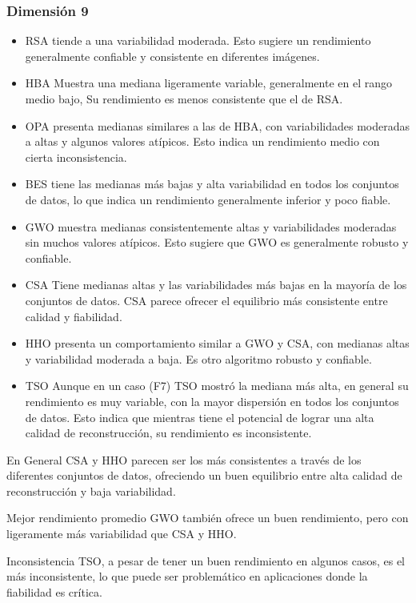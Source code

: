 \documentclass[conference]{IEEEtran}
\begin{document}
\subsubsection{Dimensión 9}
\begin{itemize}
\item RSA tiende a una variabilidad moderada. Esto sugiere un rendimiento generalmente confiable y consistente en diferentes imágenes.
\item HBA Muestra una mediana ligeramente variable, generalmente en el rango medio bajo, Su rendimiento es menos consistente que el de RSA.
\item OPA presenta medianas similares a las de HBA, con variabilidades moderadas a altas y algunos valores atípicos. Esto indica un rendimiento medio con cierta inconsistencia.
\item BES tiene las medianas más bajas y alta variabilidad en todos los conjuntos de datos, lo que indica un rendimiento generalmente inferior y poco fiable.
\item GWO muestra medianas consistentemente altas y variabilidades moderadas sin muchos valores atípicos. Esto sugiere que GWO es generalmente robusto y confiable.
\item CSA Tiene medianas altas y las variabilidades más bajas en la mayoría de los conjuntos de datos. CSA parece ofrecer el equilibrio más consistente entre calidad y fiabilidad.
\item HHO presenta un comportamiento similar a GWO y CSA, con medianas altas y variabilidad moderada a baja. Es otro algoritmo robusto y confiable.
\item TSO Aunque en un caso (F7) TSO mostró la mediana más alta, en general su rendimiento es muy variable, con la mayor dispersión en todos los conjuntos de datos. Esto indica que mientras tiene el potencial de lograr una alta calidad de reconstrucción, su rendimiento es inconsistente.
	
\end{itemize}
\noindent En General CSA y HHO parecen ser los más consistentes a través de los diferentes conjuntos de datos, ofreciendo un buen equilibrio entre alta calidad de reconstrucción y baja variabilidad.

\noindent Mejor rendimiento promedio GWO también ofrece un buen rendimiento, pero con ligeramente más variabilidad que CSA y HHO.

\noindent Inconsistencia TSO, a pesar de tener un buen rendimiento en algunos casos, es el más inconsistente, lo que puede ser problemático en aplicaciones donde la fiabilidad es crítica.
\end{document}
